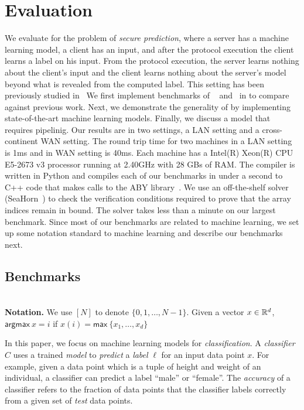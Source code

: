 \section{Evaluation}
\label{sec:eval}
We evaluate \tool for the problem of {\it secure prediction}, where a server has a machine learning model, a client has an input, and after the protocol execution the client learns a label on his input.
From the protocol execution, the server learns nothing about the client's input and the client learns nothing about the server's model beyond what is revealed from the computed label.
This setting has been previously studied in~\cite{shafindss,minionn}
We first implement benchmarks of ~\cite{shafindss} and~\cite{minionn} in \tool to compare against 
previous work.
Next, we demonstrate the generality of \tool by implementing state-of-the-art machine learning models.
Finally, we discuss a model that requires pipelinig.
Our results are in two settings, a LAN setting and a cross-continent WAN setting.
The round trip time for two machines in a LAN setting is 1ms and in WAN setting is 40ms.
Each machine has a Intel(R) Xeon(R) CPU E5-2673 v3 processor running at 2.40GHz with
28 GBs of RAM. The \tool compiler is written in Python and compiles each of our benchmarks
in under a second to C++ code that makes calls to the ABY library~\cite{aby}.
We use an off-the-shelf solver (SeaHorn~\cite{seahorn}) to check the verification conditions
required to prove that the array indices remain in bound.
The solver takes less than a minute on our largest benchmark.
Since most of our benchmarks are related to machine learning, we set up some notation standard to machine learning and describe our benchmarks next. 

\subsection{Benchmarks}
 \\

\noindent\textbf{Notation.} We use $[N]$ to denote $\{0,1,\dotsc, N-1\}$. 
Given a vector $x\in{\mathbb{R}}^d$, $\mathsf{argmax}\ x = i$ if $x(i) = \mathsf{max}\ \{x_1,\ldots,x_d\}$ 

In this paper, we focus on machine learning models for {\it classification}.
A {\it classifier} $C$ uses a trained {\it model} to {\it predict} a {\it label} $\ell$ for an input data point $x$. For example, given a data point which is a tuple of height and weight of an individual,
a classifier can predict a label ``male'' or ``female''. The {\it accuracy} of a classifier
refers to the fraction of data points that the classifier labels correctly from a given set of {\it test} data points.

